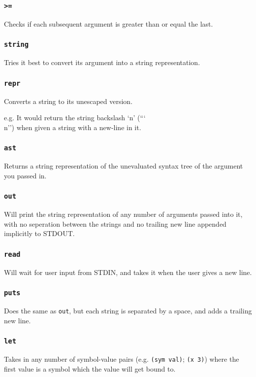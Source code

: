 \documentclass{article}
\newcommand{\code}[1]{\texttt{#1}}
\begin{document}
    \subsubsection{\code{>=}}
      Checks if each subsequent argument is greater than or equal the last.

    \subsubsection{\code{string}}
      Tries it best to convert its argument into a string
      representation.

    \subsubsection{\code{repr}}
      Converts a string to its unescaped version.

      e.g. It would return the string backslash `n' (``\char`\\n'') when
      given a string with a new-line in it.

    \subsubsection{\code{ast}}
      Returns a string representation of the unevaluated syntax tree
      of the argument you passed in.

    \subsubsection{\code{out}}
      Will print the string representation of any number of arguments
      passed into it, with no seperation between the strings and no
      trailing new line appended implicitly to STDOUT.

    \subsubsection{\code{read}}
      Will wait for user input from STDIN, and takes it when the user gives a
      new line.
    \subsubsection{\code{puts}}
      Does the same as \code{out}, but each string is separated by a space,
      and adds a trailing new line.

    \subsubsection{\code{let}}
      Takes in any number of symbol-value pairs (e.g. \code{(sym val)};
      \code{(x 3)}) where the first value is a symbol which the value will
      get bound to.
\end{document}
